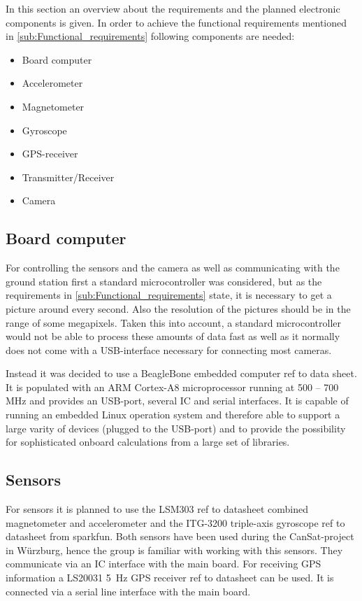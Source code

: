 \documentclass[fontsize=11pt,paper=a4,]{scrartcl}
\begin{document}
In this section an overview about the requirements and the planned electronic components is given. In order to achieve the functional requirements mentioned in \ref{sub:Functional_requirements} following components are needed:

\begin{itemize}
 \item Board computer
 \item Accelerometer
 \item Magnetometer
 \item Gyroscope
 \item GPS-receiver
 \item Transmitter/Receiver
 \item Camera
\end{itemize}


\subsection*{Board computer}

For controlling the sensors and the camera as well as communicating with the ground station first a standard microcontroller was considered, but as the requirements in \ref{sub:Functional_requirements} state, it is necessary to get a picture around every second. Also the resolution of the pictures should be in the range of some megapixels. Taken this into account, a standard microcontroller would not be able to process these amounts of data fast as well as it normally does not come with a USB-interface necessary for connecting most cameras.

Instead it was decided to use a BeagleBone embedded computer {\color{red} ref to data sheet}. It is populated with an ARM Cortex-A8 microprocessor running at 500 -- 700 MHz and provides an USB-port, several I{\texttwosuperior}C and serial interfaces. It is capable of running an embedded Linux operation system and therefore able to support a large varity of devices (plugged to the USB-port) and to provide the possibility for sophisticated onboard calculations from a large set of libraries.

\subsection*{Sensors}

For sensors it is planned to use the LSM303 {\color{red} ref to datasheet} combined magnetometer and accelerometer and the ITG-3200 triple-axis gyroscope {\color{red} ref to datasheet} from sparkfun. Both sensors have been used during the CanSat-project in Würzburg, hence the group is familiar with working with this sensors. They communicate via an I{\texttwosuperior}C interface with the main board. For receiving GPS information a LS20031 5~Hz GPS receiver {\color{red} ref to datasheet} can be used. It is connected via a serial line interface with the main board.
\end{document}
